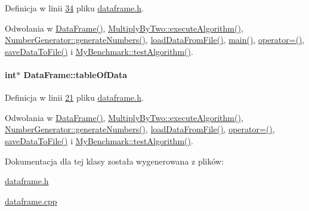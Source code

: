 Definicja w linii \hyperlink{dataframe_8h_source_l00034}{34} pliku \hyperlink{dataframe_8h_source}{dataframe.\-h}.



Odwołania w \hyperlink{dataframe_8cpp_source_l00012}{Data\-Frame()}, \hyperlink{multiplybytwo_8cpp_source_l00011}{Multiply\-By\-Two\-::execute\-Algorithm()}, \hyperlink{numbergenerator_8h_source_l00031}{Number\-Generator\-::generate\-Numbers()}, \hyperlink{dataframe_8cpp_source_l00020}{load\-Data\-From\-File()}, \hyperlink{main_8cpp_source_l00019}{main()}, \hyperlink{dataframe_8cpp_source_l00044}{operator=()}, \hyperlink{dataframe_8cpp_source_l00032}{save\-Data\-To\-File()} i \hyperlink{mybenchmark_8cpp_source_l00012}{My\-Benchmark\-::test\-Algorithm()}.

\hypertarget{class_data_frame_a8edc4ce524483e2e5069067267ccdcbf}{
\paragraph[{table\-Of\-Data}]{\setlength{\rightskip}{0pt plus 5cm}int$\ast$ Data\-Frame\-::table\-Of\-Data}}\label{class_data_frame_a8edc4ce524483e2e5069067267ccdcbf}


Definicja w linii \hyperlink{dataframe_8h_source_l00021}{21} pliku \hyperlink{dataframe_8h_source}{dataframe.\-h}.



Odwołania w \hyperlink{dataframe_8cpp_source_l00012}{Data\-Frame()}, \hyperlink{multiplybytwo_8cpp_source_l00011}{Multiply\-By\-Two\-::execute\-Algorithm()}, \hyperlink{numbergenerator_8h_source_l00031}{Number\-Generator\-::generate\-Numbers()}, \hyperlink{dataframe_8cpp_source_l00020}{load\-Data\-From\-File()}, \hyperlink{dataframe_8cpp_source_l00044}{operator=()}, \hyperlink{dataframe_8cpp_source_l00032}{save\-Data\-To\-File()} i \hyperlink{mybenchmark_8cpp_source_l00012}{My\-Benchmark\-::test\-Algorithm()}.



Dokumentacja dla tej klasy została wygenerowana z plików\-:\begin{DoxyCompactItemize}
\item 
\hyperlink{dataframe_8h}{dataframe.\-h}\item 
\hyperlink{dataframe_8cpp}{dataframe.\-cpp}\end{DoxyCompactItemize}
